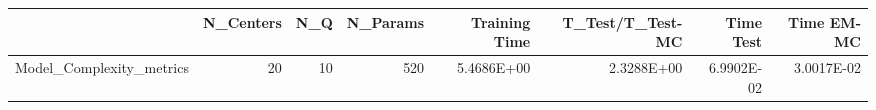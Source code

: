 \begin{tabular}{lrrrrrrr}
\toprule
{} &  N\_Centers &  N\_Q &  N\_Params &  Training Time &  T\_Test/T\_Test-MC &  Time Test &  Time EM-MC \\
\midrule
Model\_Complexity\_metrics &         20 &   10 &       520 &     5.4686E+00 &        2.3288E+00 & 6.9902E-02 &  3.0017E-02 \\
\bottomrule
\end{tabular}
